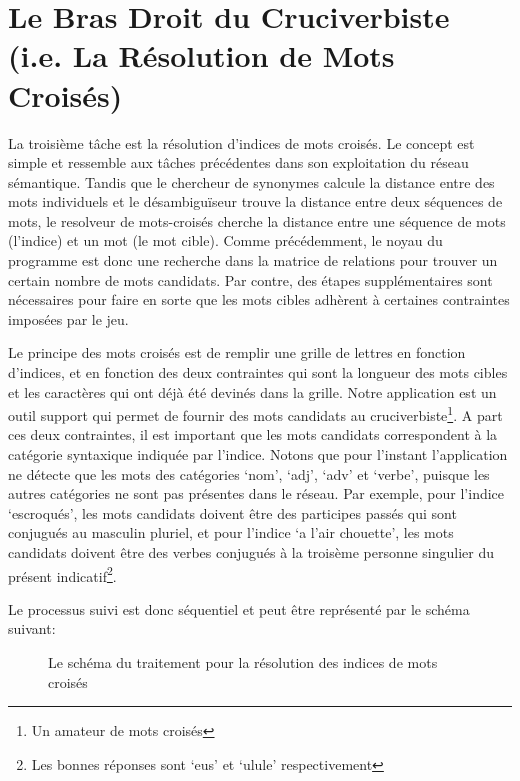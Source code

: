 \section{Le Bras Droit du Cruciverbiste (i.e. La Résolution de Mots Croisés)}

La troisième tâche est la résolution d'indices de mots croisés. Le concept est simple et ressemble aux tâches précédentes dans son exploitation du réseau sémantique. Tandis que le chercheur de synonymes calcule la distance entre des mots individuels et le désambiguïseur trouve la distance entre deux séquences de mots, le resolveur de mots-croisés cherche la distance entre une séquence de mots (l'indice) et un mot (le mot cible). Comme précédemment, le noyau du programme est donc une recherche dans la matrice de relations pour trouver un certain nombre de mots candidats. Par contre, des étapes supplémentaires sont nécessaires pour faire en sorte que les mots cibles adhèrent à certaines contraintes imposées par le jeu.

Le principe des mots croisés est de remplir une grille de lettres en fonction d'indices, et en fonction des deux contraintes qui sont la longueur des mots cibles et les caractères qui ont déjà été devinés dans la grille. Notre application est un outil support qui permet de fournir des mots candidats au cruciverbiste\footnote{Un amateur de mots croisés}. A part ces deux contraintes, il est important que les mots candidats correspondent à la catégorie syntaxique indiquée par l'indice. Notons que pour l'instant l'application ne détecte que les mots des catégories \lq{nom}\rq, \lq{adj}\rq, \lq{adv}\rq{} et \lq{verbe}\rq, puisque les autres catégories ne sont pas présentes dans le réseau. Par exemple, pour l'indice \lq{escroqués}\rq, les mots candidats doivent être des participes passés qui sont conjugués au masculin pluriel, et pour l'indice \lq{a l'air chouette}\rq, les mots candidats doivent être des verbes conjugués à la troisème personne singulier du présent indicatif\footnote{Les bonnes réponses sont \lq{eus}\rq{}  et \lq{ulule}\rq{} respectivement}.

Le processus suivi est donc séquentiel et peut être représenté par le schéma suivant:   

\begin{figure}[!ht]
\centering
\def\svgwidth{\columnwidth}

\caption{Le schéma du traitement pour la résolution des indices de mots croisés}
\label{fig:schema_crosswords}
\end{figure}

